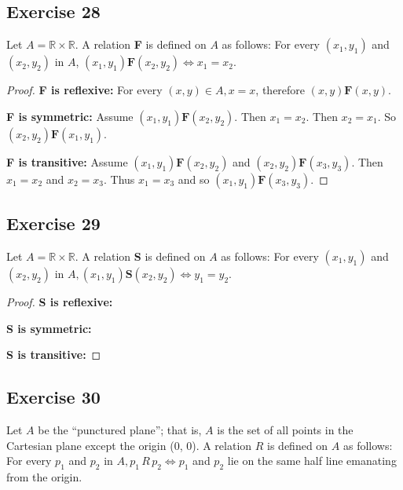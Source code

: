 \documentclass[14pt]{extarticle}
\newcommand{\R}{\mathbb{R}}
\begin{document}
\subsection{Exercise 28}
Let \(A = \R \times \R\). A relation {\bf F} is defined on \(A\) as follows: For every \((x_1, y_1)\) and \((x_2, y_2)
\) in $A$, \((x_1, y_1) \textbf{F} (x_2, y_2) \iff x_1 = x_2\).

\begin{proof}
{\bf F is reflexive:} For every \((x, y) \in A, x = x\), therefore \((x, y) \textbf{F} (x, y)\).

{\bf F is symmetric:} Assume \((x_1, y_1) \textbf{F} (x_2, y_2)\). Then \(x_1 = x_2\). Then \(x_2 = x_1\). So
\((x_2, y_2) \textbf{F} (x_1, y_1)\).

{\bf F is transitive:} Assume \((x_1, y_1) \textbf{F} (x_2, y_2)\) and \((x_2, y_2) \textbf{F} (x_3, y_3)\). Then
\(x_1 = x_2\) and \(x_2 = x_3\). Thus \(x_1 = x_3\) and so \((x_1, y_1) \textbf{F} (x_3, y_3)\).
\end{proof}

\subsection{Exercise 29}
Let \(A = \R \times \R\). A relation {\bf S} is defined on \(A\) as follows: For every \((x_1, y_1)\) and \((x_2, y_2)
\) in \(A, (x_1, y_1) \textbf{S} (x_2, y_2) \iff y_1 = y_2\).

\begin{proof}
{\bf S is reflexive:}

{\bf S is symmetric:}

{\bf S is transitive:}
\end{proof}

\subsection{Exercise 30}
Let \(A\) be the “punctured plane”; that is, \(A\) is the set of all points in the Cartesian plane except the origin 
(0, 0). A relation \(R\) is defined on \(A\) as follows: For every \(p_1\) and \(p_2\) in \(A, p_1 \, R \, p_2 \iff 
p_1\) and \(p_2\) lie on the same half line emanating from the origin.
\end{document}
